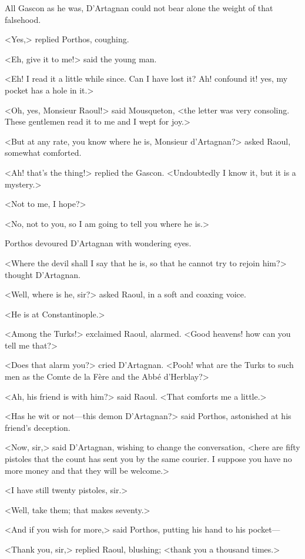 All Gascon as he was, D'Artagnan could not bear alone the weight of that falsehood.

<Yes,> replied Porthos, coughing.

<Eh, give it to me!> said the young man.

<Eh! I read it a little while since. Can I have lost it? Ah! confound it! yes, my pocket has a hole in it.>

<Oh, yes, Monsieur Raoul!> said Mousqueton, <the letter was very consoling. These gentlemen read it to me and I wept for joy.>

<But at any rate, you know where he is, Monsieur d'Artagnan?> asked Raoul, somewhat comforted.

<Ah! that's the thing!> replied the Gascon. <Undoubtedly I know it, but it is a mystery.>

<Not to me, I hope?>

<No, not to you, so I am going to tell you where he is.>

Porthos devoured D'Artagnan with wondering eyes.

<Where the devil shall I say that he is, so that he cannot try to rejoin him?> thought D'Artagnan.

<Well, where is he, sir?> asked Raoul, in a soft and coaxing voice.

<He is at Constantinople.>

<Among the Turks!> exclaimed Raoul, alarmed. <Good heavens! how can you tell me that?>

<Does that alarm you?> cried D'Artagnan. <Pooh! what are the Turks to such men as the Comte de la Fère and the Abbé d'Herblay?>

<Ah, his friend is with him?> said Raoul. <That comforts me a little.>

<Has he wit or not—this demon D'Artagnan?> said Porthos, astonished at his friend's deception.

<Now, sir,> said D'Artagnan, wishing to change the conversation, <here are fifty pistoles that the count has sent you by the same courier. I suppose you have no more money and that they will be welcome.>

<I have still twenty pistoles, sir.>

<Well, take them; that makes seventy.>

<And if you wish for more,> said Porthos, putting his hand to his pocket—

<Thank you, sir,> replied Raoul, blushing; <thank you a thousand times.>

